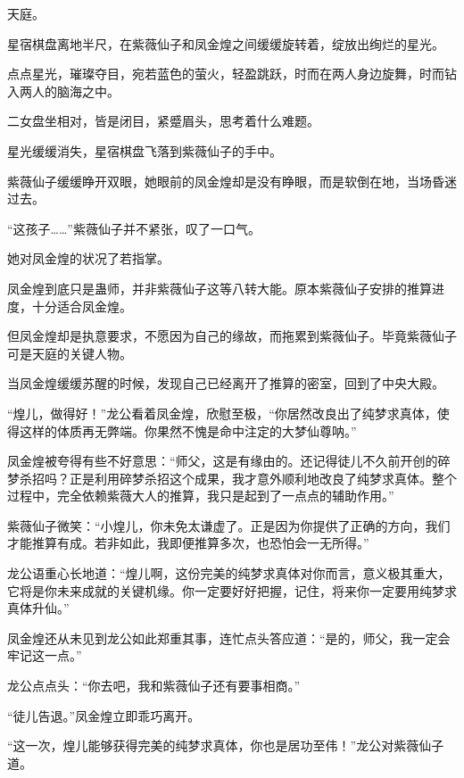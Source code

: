 
\begin{this_body}



天庭。

星宿棋盘离地半尺，在紫薇仙子和凤金煌之间缓缓旋转着，绽放出绚烂的星光。

点点星光，璀璨夺目，宛若蓝色的萤火，轻盈跳跃，时而在两人身边旋舞，时而钻入两人的脑海之中。

二女盘坐相对，皆是闭目，紧蹙眉头，思考着什么难题。

星光缓缓消失，星宿棋盘飞落到紫薇仙子的手中。

紫薇仙子缓缓睁开双眼，她眼前的凤金煌却是没有睁眼，而是软倒在地，当场昏迷过去。

“这孩子……”紫薇仙子并不紧张，叹了一口气。

她对凤金煌的状况了若指掌。

凤金煌到底只是蛊师，并非紫薇仙子这等八转大能。原本紫薇仙子安排的推算进度，十分适合凤金煌。

但凤金煌却是执意要求，不愿因为自己的缘故，而拖累到紫薇仙子。毕竟紫薇仙子可是天庭的关键人物。

当凤金煌缓缓苏醒的时候，发现自己已经离开了推算的密室，回到了中央大殿。

“煌儿，做得好！”龙公看着凤金煌，欣慰至极，“你居然改良出了纯梦求真体，使得这样的体质再无弊端。你果然不愧是命中注定的大梦仙尊呐。”

凤金煌被夸得有些不好意思：“师父，这是有缘由的。还记得徒儿不久前开创的碎梦杀招吗？正是利用碎梦杀招这个成果，我才意外顺利地改良了纯梦求真体。整个过程中，完全依赖紫薇大人的推算，我只是起到了一点点的辅助作用。”

紫薇仙子微笑：“小煌儿，你未免太谦虚了。正是因为你提供了正确的方向，我们才能推算有成。若非如此，我即便推算多次，也恐怕会一无所得。”

龙公语重心长地道：“煌儿啊，这份完美的纯梦求真体对你而言，意义极其重大，它将是你未来成就的关键机缘。你一定要好好把握，记住，将来你一定要用纯梦求真体升仙。”

凤金煌还从未见到龙公如此郑重其事，连忙点头答应道：“是的，师父，我一定会牢记这一点。”

龙公点点头：“你去吧，我和紫薇仙子还有要事相商。”

“徒儿告退。”凤金煌立即乖巧离开。

“这一次，煌儿能够获得完美的纯梦求真体，你也是居功至伟！”龙公对紫薇仙子道。


\end{this_body}
